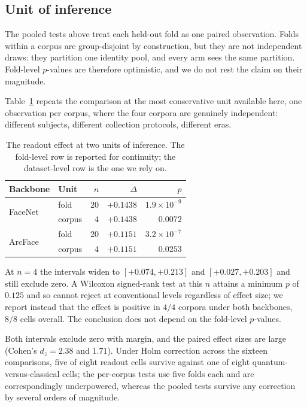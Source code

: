 \documentclass[preprint,12pt]{elsarticle}
\begin{document}
\subsection{Unit of inference}
\label{sec:inference-unit}

The pooled tests above treat each held-out fold as one paired observation.
Folds within a corpus are group-disjoint by construction, but they are not
independent draws: they partition one identity pool, and every arm sees the
same partition. Fold-level $p$-values are therefore optimistic, and we do not
rest the claim on their magnitude.

Table~\ref{tab:inference-unit} repeats the comparison at the most
conservative unit available here, one observation per corpus, where the four
corpora are genuinely independent: different subjects, different collection
protocols, different eras.

\begin{table}[t]
\centering
\caption{The readout effect at two units of inference. The fold-level row is
reported for continuity; the dataset-level row is the one we rely on.}
\label{tab:inference-unit}
\begin{tabular}{llrrr}
\toprule
Backbone & Unit & $n$ & $\Delta$ & $p$ \\
\midrule
\multirow{2}{*}{FaceNet} & fold & $20$ & $+0.1438$ & $1.9 \times 10^{-9}$ \\
 & corpus & $4$ & $+0.1438$ & $0.0072$ \\
\midrule
\multirow{2}{*}{ArcFace} & fold & $20$ & $+0.1151$ & $3.2 \times 10^{-7}$ \\
 & corpus & $4$ & $+0.1151$ & $0.0253$ \\
\bottomrule
\end{tabular}
\end{table}

At $n=4$ the intervals widen to $[+0.074, +0.213]$ and $[+0.027, +0.203]$ and
still exclude zero. A Wilcoxon signed-rank test at this $n$ attains a minimum
$p$ of $0.125$ and so cannot reject at conventional levels regardless of
effect size; we report instead that the effect is positive in $4/4$ corpora
under both backbones, $8/8$ cells overall. The conclusion does not depend on
the fold-level $p$-values.

Both intervals exclude zero with margin, and the paired effect sizes are large
(Cohen's $d_z = 2.38$ and $1.71$). Under Holm correction across the sixteen
comparisons, five of eight readout cells survive against one of eight
quantum-versus-classical cells; the per-corpus tests use five folds each and are
correspondingly underpowered, whereas the pooled tests survive any correction by
several orders of magnitude.
\end{document}
